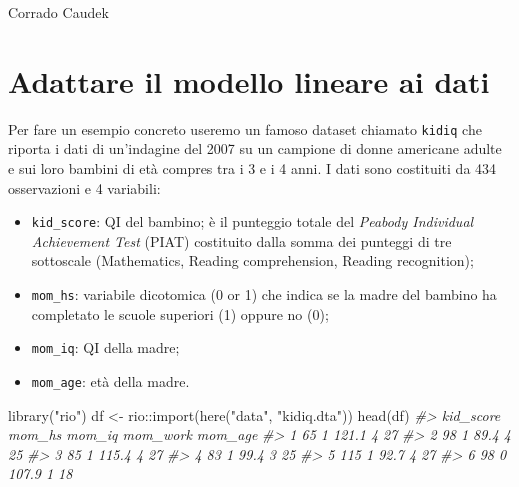 \documentclass[
  10pt,
  italian,
  a4paper,
  extrafontsizes,onecolumn,openright
  ]{memoir}
\newenvironment{Shaded}{\begin{snugshade}}{\end{snugshade}}
\newcommand{\CommentTok}[1]{\textcolor[rgb]{0.56,0.35,0.01}{\textit{#1}}}
\newcommand{\FunctionTok}[1]{\textcolor[rgb]{0.00,0.00,0.00}{#1}}
\newcommand{\NormalTok}[1]{#1}
\newcommand{\OtherTok}[1]{\textcolor[rgb]{0.56,0.35,0.01}{#1}}
\newcommand{\SpecialCharTok}[1]{\textcolor[rgb]{0.00,0.00,0.00}{#1}}
\newcommand{\StringTok}[1]{\textcolor[rgb]{0.31,0.60,0.02}{#1}}
\begin{document}
\bigskip

Corrado Caudek

\mainmatter

\hypertarget{regr-ml}{%
\chapter{Adattare il modello lineare ai dati}\label{regr-ml}}

Per fare un esempio concreto useremo un famoso dataset chiamato \texttt{kidiq} \autocite{gelman2020regression} che riporta i dati di un'indagine del 2007 su un campione di donne americane adulte e sui loro bambini di età compres tra i 3 e i 4 anni. I dati sono costituiti da 434 osservazioni e 4 variabili:

\begin{itemize}
\item
  \texttt{kid\_score}: QI del bambino; è il punteggio totale del \emph{Peabody Individual Achievement Test} (PIAT) costituito dalla somma dei punteggi di tre sottoscale (Mathematics, Reading comprehension, Reading recognition);
\item
  \texttt{mom\_hs}: variabile dicotomica (0 or 1) che indica se la madre del bambino ha completato le scuole superiori (1) oppure no (0);
\item
  \texttt{mom\_iq}: QI della madre;
\item
  \texttt{mom\_age}: età della madre.
\end{itemize}

\begin{Shaded}
\begin{Highlighting}[]
\FunctionTok{library}\NormalTok{(}\StringTok{"rio"}\NormalTok{)}
\NormalTok{df }\OtherTok{\textless{}{-}}\NormalTok{ rio}\SpecialCharTok{::}\FunctionTok{import}\NormalTok{(}\FunctionTok{here}\NormalTok{(}\StringTok{"data"}\NormalTok{, }\StringTok{"kidiq.dta"}\NormalTok{))}
\FunctionTok{head}\NormalTok{(df)}
\CommentTok{\#\textgreater{}   kid\_score mom\_hs mom\_iq mom\_work mom\_age}
\CommentTok{\#\textgreater{} 1        65      1  121.1        4      27}
\CommentTok{\#\textgreater{} 2        98      1   89.4        4      25}
\CommentTok{\#\textgreater{} 3        85      1  115.4        4      27}
\CommentTok{\#\textgreater{} 4        83      1   99.4        3      25}
\CommentTok{\#\textgreater{} 5       115      1   92.7        4      27}
\CommentTok{\#\textgreater{} 6        98      0  107.9        1      18}
\end{Highlighting}
\end{Shaded}
\end{document}

